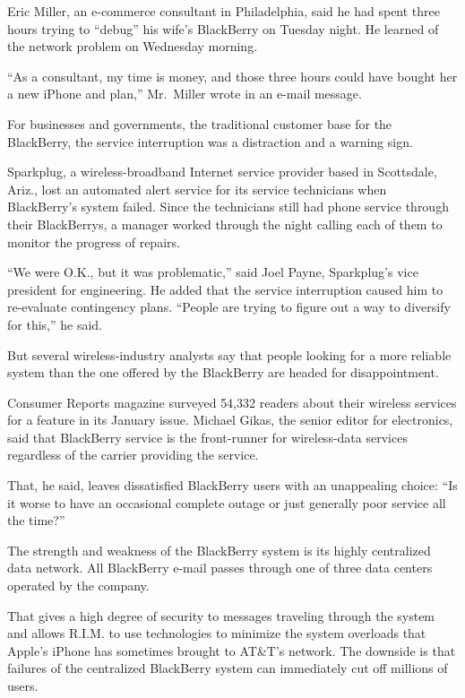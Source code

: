 ﻿\documentclass[12pt]{article}
\begin{document}
Eric Miller, an e-commerce consultant in Philadelphia, said he had spent three hours trying to
``debug'' his wife's BlackBerry on Tuesday night. He learned of the network problem on Wednesday
morning.

``As a consultant, my time is money, and those three hours could have bought her a new iPhone and
plan,'' Mr.~Miller wrote in an e-mail message.

For businesses and governments, the traditional customer base for the BlackBerry, the service
interruption was a distraction and a warning sign.

Sparkplug, a wireless-broadband Internet service provider based in Scottsdale, Ariz., lost an
automated alert service for its service technicians when BlackBerry's system failed. Since the
technicians still had phone service through their BlackBerrys, a manager worked through the night
calling each of them to monitor the progress of repairs.

``We were O.K., but it was problematic,'' said Joel Payne, Sparkplug's vice president for
engineering. He added that the service interruption caused him to re-evaluate contingency plans.
``People are trying to figure out a way to diversify for this,'' he said.

But several wireless-industry analysts say that people looking for a more reliable system than the
one offered by the BlackBerry are headed for disappointment.

Consumer Reports magazine surveyed 54,332 readers about their wireless services for a feature in its
January issue. Michael Gikas, the senior editor for electronics, said that BlackBerry service is the
front-runner for wireless-data services regardless of the carrier providing the service.

That, he said, leaves dissatisfied BlackBerry users with an unappealing choice: ``Is it worse to
have an occasional complete outage or just generally poor service all the time?''

The strength and weakness of the BlackBerry system is its highly centralized data network. All
BlackBerry e-mail passes through one of three data centers operated by the company.

That gives a high degree of security to messages traveling through the system and allows R.I.M. to
use technologies to minimize the system overloads that Apple's iPhone has sometimes brought to
AT\&T's network. The downside is that failures of the centralized BlackBerry system can immediately
cut off millions of users.
\end{document}
